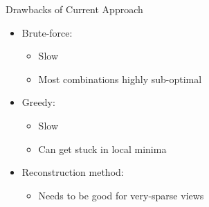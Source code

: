 \documentclass[english,aspectratio=43]{beamer}
\begin{document}
\begin{frame}{Drawbacks of Current Approach}
	\begin{itemize}
	\setlength\itemsep{2em}
	    \item Brute-force:
	        \begin{itemize}
	            \item Slow
	            \item Most combinations highly sub-optimal
	        \end{itemize}
	    
	    \item Greedy:
	        \begin{itemize}
	            \item Slow
	            \item Can get stuck in local minima
	        \end{itemize}
	        
	    \item Reconstruction method:
            \begin{itemize}
                \item Needs to be good for very-sparse views
            \end{itemize}
	    
	\end{itemize}
\end{frame}

            
            
\end{document}
